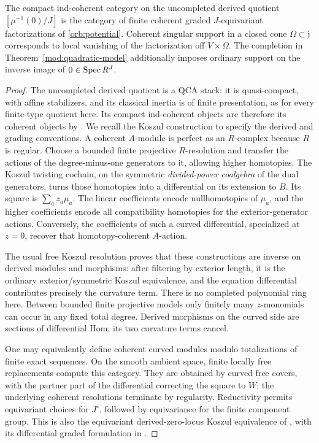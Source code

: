 \begin{lemma}\label{orb:koszul}
The compact ind-coherent category on the uncompleted derived quotient
$[\mu^{-1}(0)/J]$ is the category of finite coherent graded
$J$-equivariant factorizations of \eqref{orb:potential}.
Coherent singular support in a closed cone $\Omega\subset\mathfrak j$
corresponds to local vanishing of the factorization off
$V\times\Omega$.  The completion in
Theorem~\ref{mod:quadratic-model} additionally imposes ordinary support
on the inverse image of $0\in\operatorname{Spec} R^J$.
\end{lemma}

\begin{proof}
The uncompleted derived quotient is a QCA stack: it is
quasi-compact, with affine stabilizers, and its classical inertia is of
finite presentation, as for every finite-type quotient here. Its compact
ind-coherent objects are therefore its coherent objects by
\cite[Theorem~3.3.5]{DGFiniteness}.  We recall the Koszul construction
to specify the derived and grading conventions.
A coherent $A$-module is perfect as an $R$-complex because
$R$ is regular.  Choose a bounded finite projective $R$-resolution and
transfer the actions of the degree-minus-one generators to it, allowing
higher homotopies.  The Koszul twisting cochain, on the symmetric
\emph{divided-power coalgebra} of the dual generators, turns those
homotopies into a differential on its extension to $B$.  Its square is
$\sum_a z_a\mu_a$.  The linear coefficients encode nullhomotopies of
$\mu_a$, and the higher coefficients encode all compatibility
homotopies for the exterior-generator actions.  Conversely, the
coefficients of such a curved differential, specialized at $z=0$,
recover that homotopy-coherent $A$-action.

The usual free Koszul resolution proves that these constructions are
inverse on derived modules and morphisms: after filtering by exterior
length, it is the ordinary exterior/symmetric Koszul equivalence, and
the equation differential contributes precisely the curvature term.
There is no completed polynomial ring here.  Between bounded finite
projective models only finitely many $z$-monomials can occur in any
fixed total degree.  Derived morphisms on the curved side are sections
of differential Hom; its two curvature terms cancel.

One may equivalently define coherent curved modules modulo
totalizations of finite exact sequences.  On the smooth ambient
space, finite locally free replacements compute this category.
They are obtained by curved free covers, with the partner part of the
differential correcting the square to $W$; the underlying coherent
resolutions terminate by regularity.  Reductivity permits equivariant
choices for $J^\circ$, followed by equivariance for the finite component
group.  This is also the equivariant derived-zero-locus Koszul
equivalence of \cite[Theorem~2.3.3]{Toda}, with its differential graded
formulation in \cite[Theorem~2.1]{PT-koszul}.


\end{proof}
